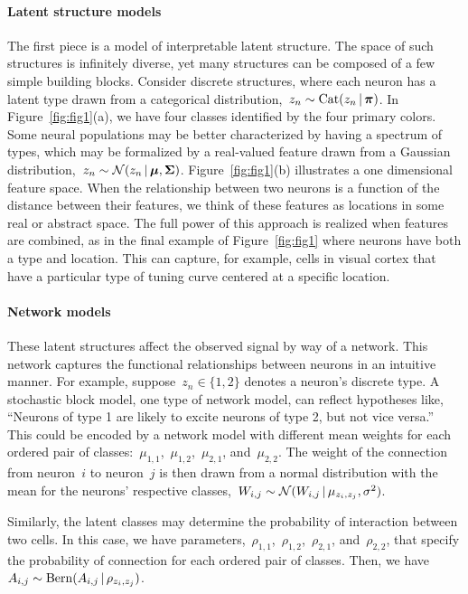 \paragraph{Latent structure models}
The first piece is a model of interpretable latent structure. 
The space of such structures is infinitely diverse, yet many structures can be composed of a few simple building blocks.
Consider discrete structures, where each neuron has a latent type drawn from a categorical distribution,~$z_n \sim \mathrm{Cat}(z_n \,|\, \boldsymbol{\pi})$. 
In Figure~\ref{fig:fig1}(a), we have four classes identified by the four primary colors.
Some neural populations may be better characterized by having a spectrum of types, which may be formalized by a real-valued feature drawn from a Gaussian distribution,~$z_n \sim \mathcal{N}(z_n \,|\, \boldsymbol{\mu}, \boldsymbol{\Sigma})$. 
Figure~\ref{fig:fig1}(b) illustrates a one dimensional feature space.
When the relationship between two neurons is a function of the distance between their features, we think of these features as locations in some real or abstract space. 
The full power of this approach is realized when features are combined, as in the final example of Figure~\ref{fig:fig1} where neurons have both a type and location. 
This can capture, for example, cells in visual cortex that have a particular type of tuning curve centered at a specific location. 

\paragraph{Network models}
These latent structures affect the observed signal by way of a network. 
This network captures the functional relationships between neurons in an intuitive manner.
For example, suppose~${z_n \in \{1, 2\}}$ denotes a neuron's discrete type. 
A stochastic block model, one type of network model, can reflect hypotheses like, ``Neurons of type 1 are likely to excite neurons of type 2, but not vice versa.''  
This could be encoded by a network model with different mean weights for each ordered pair of classes:~$\mu_{1,1}$,~$\mu_{1,2}$,~$\mu_{2,1}$, and~$\mu_{2,2}$.
The weight of the connection from neuron~$i$ to neuron~$j$ is then drawn from a normal distribution with the mean for the neurons' respective classes,~$W_{i,j} \sim \mathcal{N}(W_{i,j} \,|\, \mu_{z_i, z_j}, \sigma^2)$. 

Similarly, the latent classes may determine the probability of interaction between two cells. In this case, we have parameters,~$\rho_{1,1}$,~$\rho_{1,2}$,~$\rho_{2,1}$, and~$\rho_{2,2}$, that specify the probability of connection for each ordered pair of classes.
Then, we have~$A_{i,j} \sim \mathrm{Bern}(A_{i,j} \,|\, \rho_{z_i, z_j})$.

